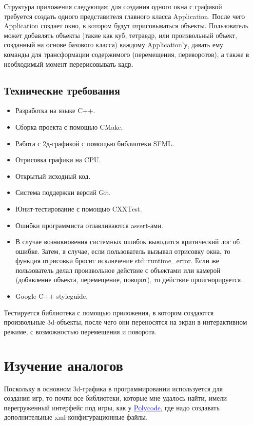 \documentclass{article}
\begin{document}
Структура приложения следующая: для создания одного окна с графикой требуется создать одного представителя главного класса Application. После чего Application создает окно, в котором будут отрисовываться объекты. Пользователь может добавлять объекты (такие как куб, тетраедр, или произвольный объект, созданный на основе базового класса) каждому Application'у, давать ему команды для трансформации содержимого (перемещения, переворотов), а также в необходимый момент перерисовывать кадр.

\subsection{Технические требования}
\begin{itemize}
\item Разработка на языке C++.
\item Сборка проекта с помощью CMake.
\item Работа с 2д-графикой с помощью библиотеки SFML.
\item Отрисовка графики на CPU.
\item Открытый исходный код.
\item Система поддержки версий Git.
\item Юнит-тестирование с помощью CXXTest.
\item Ошибки программиста отлавливаются assert-ами.
\item В случае возникновения системных ошибок выводится критический лог об ошибке. Затем, в случае, если пользователь вызывал отрисовку окна, то функция отрисовки бросит исключение std::runtime\_error. Если же пользователь делал произвольное действие с объектами или камерой (добавление объекта, перемещение, поворот), то действие проигнорируется.
\item Google C++ styleguide.
\end{itemize}

Тестируется библиотека с помощью приложения, в котором создаются произвольные 3d-объекты, после чего они переносятся на экран в интерактивном режиме, с возможностью перемещения и поворота.

\newpage

\section{Изучение аналогов}

Поскольку в основном 3d-графика в программировании используется для создания игр, то почти все библиотеки, которые мне удалось найти, имели перегруженный интерфейс под игры, как у \href{http://polycode.org/features/}{\textcolor{blue}{Polycode}}, где надо создавать дополнительные xml-конфигурационные файлы.
\end{document}

